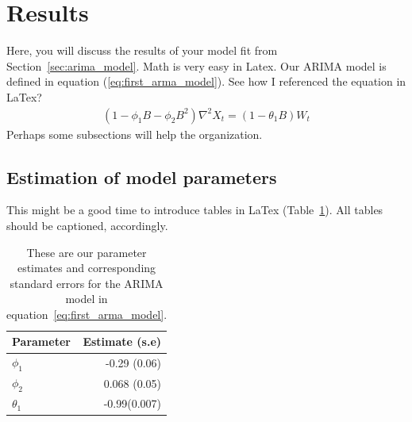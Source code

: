\documentclass[a4paper]{article}
\begin{document}



\section{Results}\label{sec:results}
Here, you will discuss the results of your model fit from
Section~\ref{sec:arima_model}.
%
Math is very easy in Latex. Our ARIMA
model is defined in equation (\ref{eq:first_arma_model}). See how I referenced the
equation in LaTex?
\begin{align}
	(1 - \phi_1 B - \phi_2B^2) \nabla^2 X_t = (1 - \theta_1 B)W_t
	\label{eq:first_arma_model}
\end{align}
Perhaps some subsections will help the organization.
%
\subsection{Estimation of model parameters }
This might be a good time to introduce tables
in LaTex (Table~\ref{tab:param_est}).
All tables should be captioned, accordingly.

\begin{table}[h!]
	\centering
	\begin{tabular}{l|r}
	  Parameter & Estimate (s.e) \\ \hline
	  $\phi_1$& -0.29 (0.06) \\
	  $\phi_2$ & 0.068 (0.05) \\
		$\theta_1$ & -0.99(0.007)
	\end{tabular}
	\caption{These are our parameter estimates and corresponding standard errors
	for the ARIMA model in
	equation~\ref{eq:first_arma_model}. }
	\label{tab:param_est}
\end{table}
\newpage
\end{document}
